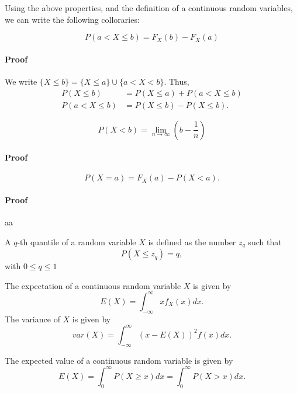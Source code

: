 \documentclass[5pt, a4paper]{article}
\begin{document}
    Using the above properties, and the definition of a continuous random
    variables, we can write the following colloraries:

    \[P(a < X \le b) = F_X(b) - F_X(a)\]

    \paragraph{Proof}

    We write $\{X\le b\} = \{X \le  a\} \cup \{a < X < b\}$. Thus, 
    \begin{align*}
        P(X \le  b) &= P(X \le  a) + P(a < X \le b) \\
        P(a < X \le b) &= P(X \le b) - P(X \le b)
    .\end{align*}

    \[P(X <b) = \lim_{n \to \infty} \left( b - \frac{1}{n} \right) \]

    \paragraph{Proof}

        \[P(X=a) = F_X(a) - P(X < a).\] 

    \paragraph{Proof} aa


    \begin{tcolorbox}[title= q-th Quantile]
        A $q$-th quantile of a random variable $X$ is defined as the number
        $z_q$ such that  \[
        P(X \le z_q) = q
        ,\] with $0\le q\le 1$  
    \end{tcolorbox}
    \begin{tcolorbox}[title=Expectation of a Continuous Random Variable]
        The expectation of a continuous random variable $X$ is given by  \[
            E(X) = \int_{-\infty}^{\infty} xf_X(x) dx
        .\] 
        The variance of $X$ is given by  \[
            var(X) = \int_{-\infty}^{\infty}\left(x - E(X)\right)^2 f(x)dx
        .\] 
    \end{tcolorbox}
    \begin{tcolorbox}[title=Tail-Sum Formula]
        The expected value of a continuous random variable is given by \[
            E(X) = \int_{0}^{\infty}P(X\ge x)dx = \int_{0}^{\infty}P(X>x)dx
        .\] 
    \end{tcolorbox}
\end{document}
